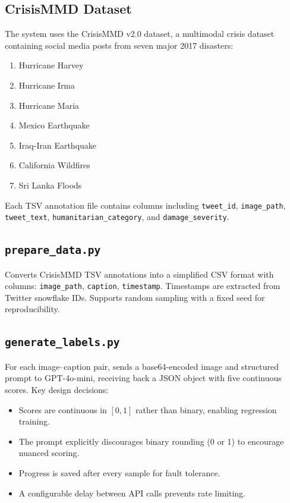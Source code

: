 \documentclass[11pt,a4paper]{article}
\begin{document}
\subsection{CrisisMMD Dataset}

The system uses the CrisisMMD v2.0 dataset, a multimodal crisis dataset containing social media posts from seven major 2017 disasters:

\begin{enumerate}
    \item Hurricane Harvey
    \item Hurricane Irma
    \item Hurricane Maria
    \item Mexico Earthquake
    \item Iraq-Iran Earthquake
    \item California Wildfires
    \item Sri Lanka Floods
\end{enumerate}

Each TSV annotation file contains columns including \texttt{tweet\_id}, \texttt{image\_path}, \texttt{tweet\_text}, \texttt{humanitarian\_category}, and \texttt{damage\_severity}.

\subsection{\texttt{prepare\_data.py}}

Converts CrisisMMD TSV annotations into a simplified CSV format with columns: \texttt{image\_path}, \texttt{caption}, \texttt{timestamp}. Timestamps are extracted from Twitter snowflake IDs. Supports random sampling with a fixed seed for reproducibility.

\subsection{\texttt{generate\_labels.py}}

For each image--caption pair, sends a base64-encoded image and structured prompt to GPT-4o-mini, receiving back a JSON object with five continuous scores. Key design decisions:
\begin{itemize}
    \item Scores are continuous in $[0, 1]$ rather than binary, enabling regression training.
    \item The prompt explicitly discourages binary rounding (0 or 1) to encourage nuanced scoring.
    \item Progress is saved after every sample for fault tolerance.
    \item A configurable delay between API calls prevents rate limiting.
\end{itemize}
\end{document}
